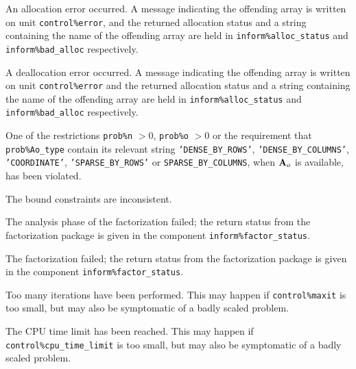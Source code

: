 \documentclass{galahad}
\begin{document}
\begin{description}

 An allocation error occurred. A message indicating
the offending
array is written on unit {\tt control\%error}, and the returned allocation
status and a string containing the name of the offending array
are held in {\tt inform\%alloc\_\-status}
and {\tt inform\%bad\_alloc} respectively.

 A deallocation error occurred.
A message indicating the offending
array is written on unit {\tt control\%error} and the returned allocation
status and a string containing the name of the offending array
are held in {\tt inform\%alloc\_\-status}
and {\tt inform\%bad\_alloc} respectively.

 One of the restrictions
 {\tt prob\%n} $> 0$,
 {\tt prob\%o} $> 0$
    or the requirement that
    {\tt prob\%Ao\_type} contain its relevant string
    {\tt 'DENSE\_BY\_ROWS'}, 
    {\tt 'DENSE\_BY\_COLUMNS'}, {\tt 'COORDINATE'}, {\tt 'SPARSE\_BY\_ROWS'}
    or {\tt SPARSE\_BY\_COLUMNS},
    when ${\mathbf{A}}_o$ is available,  has been violated.


 The bound constraints are inconsistent.


 The analysis phase of the factorization failed;
  the return status from the factorization
    package is given in the component {\tt inform\%fac\-t\-or\_status}.

 The factorization failed; the return status
  from the factorization
    package is given in the component {\tt inform\%fac\-t\-or\_status}.



 Too many iterations have been performed.
   This may happen if
    {\tt control\%maxit} is too small, but may also be symptomatic of
    a badly scaled problem.

 The CPU time limit has been reached. This may happen if
    {\tt control\%cpu\_time\_limit} is too small, but may also be symptomatic
    of a badly scaled problem.


\end{description}
\end{document}

